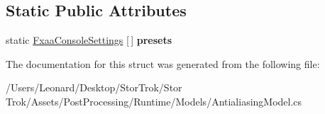 \subsection*{Static Public Attributes}
\begin{DoxyCompactItemize}
\item 
\mbox{\label{struct_unity_engine_1_1_post_processing_1_1_antialiasing_model_1_1_fxaa_console_settings_a9b6cc245d52f7e835e731723bb678e01}} 
static \hyperlink{struct_unity_engine_1_1_post_processing_1_1_antialiasing_model_1_1_fxaa_console_settings}{Fxaa\+Console\+Settings} \mbox{[}$\,$\mbox{]} {\bfseries presets}
\end{DoxyCompactItemize}


The documentation for this struct was generated from the following file\+:\begin{DoxyCompactItemize}
\item 
/\+Users/\+Leonard/\+Desktop/\+Stor\+Trok/\+Stor Trok/\+Assets/\+Post\+Processing/\+Runtime/\+Models/Antialiasing\+Model.\+cs\end{DoxyCompactItemize}
